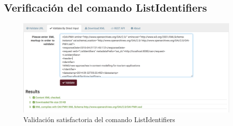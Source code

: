 \subsection{Verificación del comando ListIdentifiers}

\begin{figure}[!htbp]
	\centering
	\includegraphics[scale=0.32]{fig/oaipmh_validations/ListIdentifiers}
	\caption{Validación satisfactoria del comando ListIdentifiers}
	\label{fig:listidentifiers}
\end{figure}
